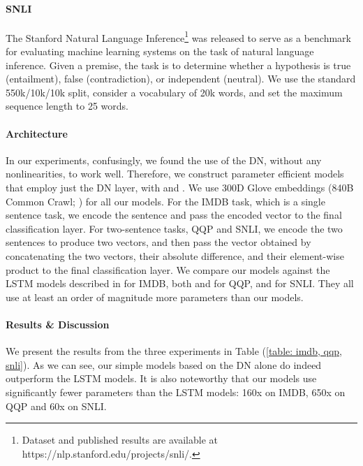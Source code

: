 \documentclass{article}
\begin{document}
\paragraph{SNLI} The Stanford Natural Language Inference\footnote{ Dataset and published results are available at https://nlp.stanford.edu/projects/snli/.} was released to serve as a benchmark for evaluating machine learning systems on the task of natural language inference. Given a premise, the task is to determine whether a hypothesis is true (entailment), false (contradiction), or independent (neutral). We use the standard 550k/10k/10k split, consider a vocabulary of 20k words, and set the maximum sequence length to 25 words. 

\paragraph{Architecture} In our experiments, confusingly, we found the use of the DN, without any nonlinearities, to work well. Therefore, we construct parameter efficient models that employ just the DN layer, with  and . We use 300D Glove embeddings (840B Common Crawl; \citet{pennington2014glove}) for all our models. For the IMDB task, which is a single sentence task, we encode the sentence and pass the encoded vector to the final classification layer. For two-sentence tasks, QQP and SNLI, we encode the two sentences to produce two vectors, and then pass the vector obtained by concatenating the two vectors, their absolute difference, and their element-wise product to the final classification layer. We compare our models against the LSTM models described in \cite{gu2020hippo} for IMDB, both \cite{shen2018baseline} and \cite{sharma2019natural} for QQP, and \cite{bowman2015large} for SNLI. They all use at least an order of magnitude more parameters than our models.

\paragraph{Results \& Discussion} We present the results from the three experiments in Table (\ref{table: imdb, qqp, snli}). As we can see, our simple models based on the DN alone do indeed outperform the LSTM models. It is also noteworthy that our models use significantly fewer parameters than the LSTM models: 160x on IMDB, 650x on QQP and 60x on SNLI. 
\end{document}
